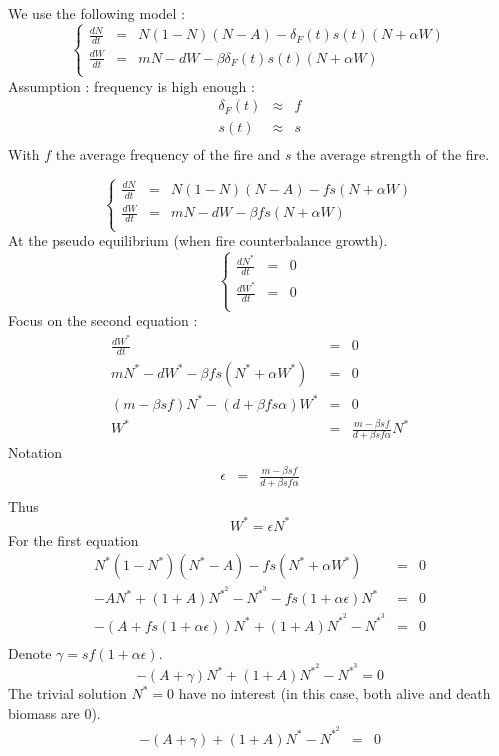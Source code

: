 \documentclass{article}
\begin{document}
We use the following model :
\[
\left\lbrace
\begin{array}{rcl}
\frac{dN}{dt} & = & N(1-N)(N-A) - \delta_F(t)s(t)(N+\alpha W) \\
\frac{dW}{dt} & = & mN -dW - \beta\delta_F(t)s(t)(N+\alpha W) \\
\end{array}
\right.
\]
Assumption : frequency is high enough : 
\[
\begin{array}{rcl}
\delta_F(t) & \approx & f \\
s(t) & \approx & s \\
\end{array}
\]
With $f$ the average frequency of the fire and $s$ the average strength of the fire.


\[
\left\lbrace
\begin{array}{rcl}
\frac{dN}{dt} & = & N(1-N)(N-A) - f s (N+\alpha W) \\
\frac{dW}{dt} & = & mN -dW - \beta f s (N+\alpha W) \\
\end{array}
\right.
\]
At the pseudo equilibrium (when fire counterbalance growth).
\[
\left\lbrace
\begin{array}{rcl}
\frac{dN^*}{dt} & = & 0 \\
\frac{dW^*}{dt} & = & 0 \\
\end{array}
\right.
\]
Focus on the second equation : 
\[
\begin{array}{rcl}
\frac{dW^*}{dt} & = & 0 \\
mN^*-dW^* -\beta f s (N^*+\alpha W^*) & = & 0 \\
(m-\beta s f)N^* - (d+\beta f s \alpha) W^* & = & 0 \\
W^* & = & \frac{m-\beta s f}{d + \beta s f \alpha} N^*
\end{array}
\]
Notation
\[
\begin{array}{rcl}
\epsilon & = & \frac{m-\beta s f}{d + \beta s f \alpha} \\
\end{array}
\]
Thus
\[
W^* = \epsilon N^*
\]
For the first equation
\[
\begin{array}{rcl}
N^*(1-N^*)(N^*-A) - f s (N^*+\alpha W^*) & = & 0 \\
-AN^*+(1+A)N^{*^2}-N^{*^3} -f s (1+\alpha\epsilon)N^* & = & 0 \\
-(A+f s (1+\alpha\epsilon))N^*+(1+A)N^{*^2}-N^{*^3} & = & 0 \\
\end{array}
\]
Denote $\gamma = sf(1+\alpha\epsilon)$. 
\begin{equation}
-(A+\gamma)N^*+(1+A)N^{*^2}-N^{*^3} = 0
\end{equation}
The trivial solution $N^* = 0$ have no interest (in this case, both alive and death biomass are $0$).
\[
\begin{array}{rcl}
-(A+\gamma)+(1+A)N^{*}-N^{*^2} & = & 0 \\
\end{array}
\]
\end{document}
